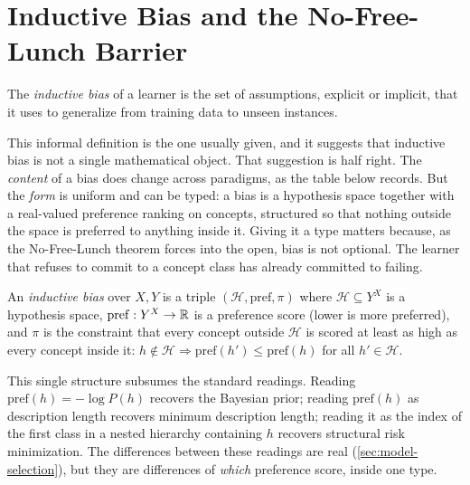 \section{Inductive Bias and the No-Free-Lunch Barrier}
\label{sec:inductive-bias}

\begin{defn}
\label{def:inductive-bias}
The \emph{inductive bias} of a learner is the set of assumptions, explicit or implicit, that it uses to generalize from training data to unseen instances.
\end{defn}

This informal definition is the one usually given, and it suggests that inductive bias is not a single mathematical object. That suggestion is half right. The \emph{content} of a bias does change across paradigms, as the table below records. But the \emph{form} is uniform and can be typed: a bias is a hypothesis space together with a real-valued preference ranking on concepts, structured so that nothing outside the space is preferred to anything inside it. Giving it a type matters because, as the No-Free-Lunch theorem forces into the open, bias is not optional. The learner that refuses to commit to a concept class has already committed to failing.

\begin{defn}
\label{def:inductive-bias-typed}
An \emph{inductive bias} over $X, Y$ is a triple $(\mathcal{H}, \mathrm{pref}, \pi)$ where $\mathcal{H} \subseteq Y^X$ is a hypothesis space, $\mathrm{pref} : Y^X \to \mathbb{R}$ is a preference score (lower is more preferred), and $\pi$ is the constraint that every concept outside $\mathcal{H}$ is scored at least as high as every concept inside it: $h \notin \mathcal{H} \Rightarrow \mathrm{pref}(h') \leq \mathrm{pref}(h)$ for all $h' \in \mathcal{H}$.
\end{defn}

This single structure subsumes the standard readings. Reading $\mathrm{pref}(h) = -\log P(h)$ recovers the Bayesian prior; reading $\mathrm{pref}(h)$ as description length recovers minimum description length; reading it as the index of the first class in a nested hierarchy containing $h$ recovers structural risk minimization. The differences between these readings are real (\cref{sec:model-selection}), but they are differences of \emph{which} preference score, inside one type.


